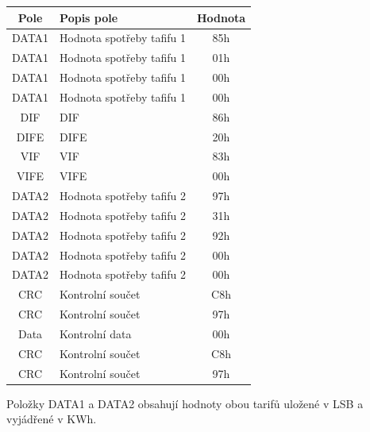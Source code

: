 \begin{table}[!ht]
\centering
\begin{tabular}{|c|l|c|}
\hline
\textbf{Pole}      & \textbf{Popis pole}            & \textbf{Hodnota} \\ \hline

DATA1 & Hodnota spotřeby tafifu 1 & 85h \\ \hline
DATA1 & Hodnota spotřeby tafifu 1 & 01h \\ \hline
DATA1 & Hodnota spotřeby tafifu 1 & 00h \\ \hline
DATA1 & Hodnota spotřeby tafifu 1 & 00h \\ \hline
DIF & DIF & 86h \\ \hline
DIFE & DIFE & 20h \\ \hline
VIF & VIF & 83h \\ \hline
VIFE & VIFE & 00h \\ \hline
DATA2 & Hodnota spotřeby tafifu 2 & 97h \\ \hline
DATA2 & Hodnota spotřeby tafifu 2 & 31h \\ \hline
DATA2 & Hodnota spotřeby tafifu 2 & 92h \\ \hline
DATA2 & Hodnota spotřeby tafifu 2 & 00h \\ \hline
DATA2 & Hodnota spotřeby tafifu 2 & 00h \\ \hline
CRC & Kontrolní součet & C8h \\ \hline
CRC & Kontrolní součet & 97h \\ \hline
Data & Kontrolní data & 00h \\ \hline
CRC & Kontrolní součet & C8h \\ \hline
CRC & Kontrolní součet & 97h \\ \hline \hline
\end{tabular}
\end{table}

\newpage

\vspace{+10pt}	

Položky DATA1 a DATA2 obsahují hodnoty obou tarifů uložené v LSB a vyjádřené v KWh.

